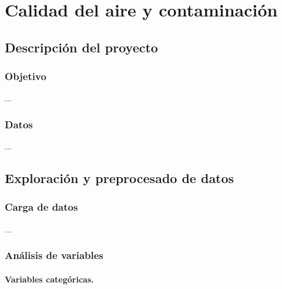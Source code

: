 \section{Calidad del aire y contaminación}

\subsection{Descripción del proyecto}

\subsubsection{Objetivo}

...


\subsubsection{Datos}

...


\subsection{Exploración y preprocesado de datos}

\subsubsection{Carga de datos}

...


\subsubsection{Análisis de variables}

\paragraph*{Variables categóricas.}

